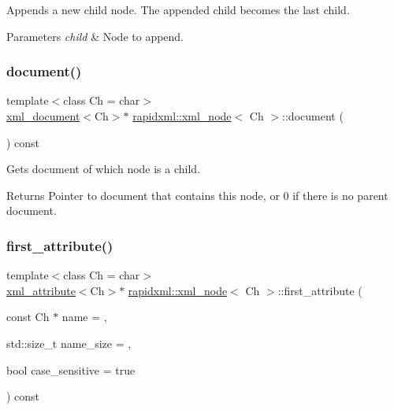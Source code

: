 Appends a new child node. The appended child becomes the last child. 
\begin{DoxyParams}{Parameters}
{\em child} & Node to append. \\
\hline
\end{DoxyParams}
\mbox{\label{classrapidxml_1_1xml__node_af23d2d56182411e9261ca6974bfd767f}} 
\subsubsection{\texorpdfstring{document()}{document()}}
{\footnotesize\ttfamily template$<$class Ch = char$>$ \\
\mbox{\hyperlink{classrapidxml_1_1xml__document}{xml\+\_\+document}}$<$Ch$>$$\ast$ \mbox{\hyperlink{classrapidxml_1_1xml__node}{rapidxml\+::xml\+\_\+node}}$<$ Ch $>$\+::document (\begin{DoxyParamCaption}{ }\end{DoxyParamCaption}) const\hspace{0.3cm}{\ttfamily [inline]}}

Gets document of which node is a child. \begin{DoxyReturn}{Returns}
Pointer to document that contains this node, or 0 if there is no parent document. 
\end{DoxyReturn}
\mbox{\label{classrapidxml_1_1xml__node_ab816ab6f13ee4b0588d5b76b0697511c}} 
\subsubsection{\texorpdfstring{first\+\_\+attribute()}{first\_attribute()}}
{\footnotesize\ttfamily template$<$class Ch = char$>$ \\
\mbox{\hyperlink{classrapidxml_1_1xml__attribute}{xml\+\_\+attribute}}$<$Ch$>$$\ast$ \mbox{\hyperlink{classrapidxml_1_1xml__node}{rapidxml\+::xml\+\_\+node}}$<$ Ch $>$\+::first\+\_\+attribute (\begin{DoxyParamCaption}\item[{const Ch $\ast$}]{name = {},  }\item[{std\+::size\+\_\+t}]{name\+\_\+size = {},  }\item[{bool}]{case\+\_\+sensitive = {\ttfamily true} }\end{DoxyParamCaption}) const\hspace{0.3cm}{\ttfamily [inline]}}

